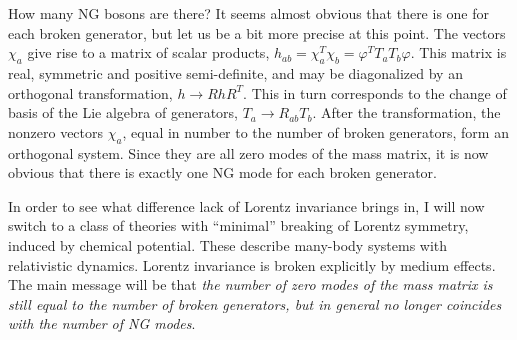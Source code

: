 \documentclass[final,3p,times,12pt,a4paper,sort&compress]{elsarticle}
\newcommand\vp{\varphi}
\begin{document}
How many NG bosons are there? It seems almost obvious that there is one for
each broken generator, but let us be a bit more precise at this point. The
vectors $\chi_a$ give rise to a matrix of scalar products,
$h_{ab}=\chi^T_a\chi_b=\vp^TT_aT_b\vp$. This matrix is real, symmetric and
positive semi-definite, and may be diagonalized by an orthogonal
transformation, $h\to RhR^T$. This in turn corresponds to the change of basis
of the Lie algebra of generators, $T_a\to R_{ab}T_b$. After the transformation,
the nonzero vectors $\chi_a$, equal in number to the number of broken
generators, form an orthogonal system. Since they are all zero modes of
the mass matrix, it is now obvious that there is exactly one NG mode for each
broken generator.

In order to see what difference lack of Lorentz invariance brings in, I will
now switch to a class of theories with ``minimal'' breaking of Lorentz
symmetry, induced by chemical potential. These describe many-body systems with
relativistic dynamics. Lorentz invariance is broken explicitly by medium
effects. The main message will be that \emph{the number of zero modes of the
mass matrix is still equal to the number of broken generators, but in general no
longer coincides with the number of NG modes}.
\end{document}
